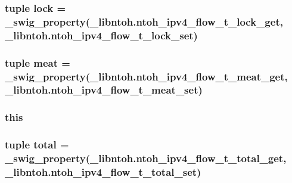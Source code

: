 \hypertarget{classlibntoh_1_1ntoh__ipv4__flow__t_a871c7bf899334194698c2a3bced5e064}{
\subsubsection[{lock}]{\setlength{\rightskip}{0pt plus 5cm}tuple lock = {\bf \-\_\-swig\-\_\-property}(\-\_\-libntoh.\-ntoh\-\_\-ipv4\-\_\-flow\-\_\-t\-\_\-lock\-\_\-get, \-\_\-libntoh.\-ntoh\-\_\-ipv4\-\_\-flow\-\_\-t\-\_\-lock\-\_\-set)\hspace{0.3cm}{\ttfamily [static]}}}\label{classlibntoh_1_1ntoh__ipv4__flow__t_a871c7bf899334194698c2a3bced5e064}
\hypertarget{classlibntoh_1_1ntoh__ipv4__flow__t_a05f7a909b2438fcd11159037a9b76457}{
\subsubsection[{meat}]{\setlength{\rightskip}{0pt plus 5cm}tuple meat = {\bf \-\_\-swig\-\_\-property}(\-\_\-libntoh.\-ntoh\-\_\-ipv4\-\_\-flow\-\_\-t\-\_\-meat\-\_\-get, \-\_\-libntoh.\-ntoh\-\_\-ipv4\-\_\-flow\-\_\-t\-\_\-meat\-\_\-set)\hspace{0.3cm}{\ttfamily [static]}}}\label{classlibntoh_1_1ntoh__ipv4__flow__t_a05f7a909b2438fcd11159037a9b76457}
\hypertarget{classlibntoh_1_1ntoh__ipv4__flow__t_a05c09a5e9d53fa7adf0a7936038c2fa3}{
\subsubsection[{this}]{\setlength{\rightskip}{0pt plus 5cm}this}}\label{classlibntoh_1_1ntoh__ipv4__flow__t_a05c09a5e9d53fa7adf0a7936038c2fa3}
\hypertarget{classlibntoh_1_1ntoh__ipv4__flow__t_a707ba789fae19e34fbeeca4da8c30c5f}{
\subsubsection[{total}]{\setlength{\rightskip}{0pt plus 5cm}tuple total = {\bf \-\_\-swig\-\_\-property}(\-\_\-libntoh.\-ntoh\-\_\-ipv4\-\_\-flow\-\_\-t\-\_\-total\-\_\-get, \-\_\-libntoh.\-ntoh\-\_\-ipv4\-\_\-flow\-\_\-t\-\_\-total\-\_\-set)\hspace{0.3cm}{\ttfamily [static]}}}\label{classlibntoh_1_1ntoh__ipv4__flow__t_a707ba789fae19e34fbeeca4da8c30c5f}
